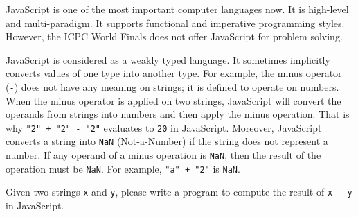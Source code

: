 JavaScript is one of the most important computer languages now.
It is high-level and multi-paradigm.
It supports functional and imperative programming styles.
However, the ICPC World Finals does not offer JavaScript
for problem solving.

JavaScript is considered as a weakly typed language.
It sometimes implicitly converts values of one type into another type.
For example, the minus operator (\verb|-|) does not have any meaning on strings;
it is defined to operate on numbers. 
When the minus operator is applied on two strings, JavaScript will convert
the operands from strings into numbers and then apply the minus operation.
That is why \verb|"2" + "2" - "2"| evaluates to \verb+20+ in JavaScript.
Moreover,
JavaScript converts a string into \verb+NaN+ 
(Not-a-Number) if the string does not represent a number. 
If any operand of a minus operation is \verb+NaN+, 
then the result of the operation must be \verb+NaN+.
For example, \verb|"a" + "2"| is \verb+NaN+.

Given two strings \verb+x+ and \verb+y+, 
please write a program to compute the result 
of \verb|x - y| in JavaScript.
